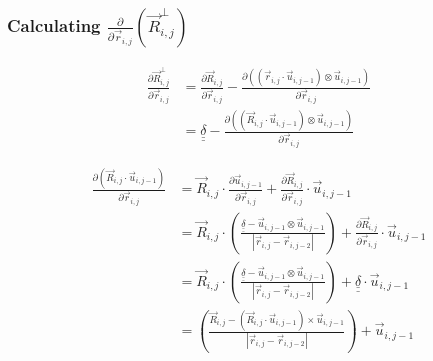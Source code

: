 \documentclass{article}
\renewcommand{\ij}{_{i,j}}
\newcommand{\ijj}{_{i,j-1}}
\newcommand{\ijjj}{_{i,j-2}}
\newcommand{\magn}[1]{\left\vert #1 \right\vert }
\renewcommand{\part}[2]{\frac{\partial #1 }{\partial #2}}
\newcommand{\partbig}[2]{\frac{\partial }{\partial #2}\left( #1 \right)}
\newcommand{\ten}[1]{\underline{\underline{#1}}}
\newcommand{\rij}{\vec{r} \ij}
\newcommand{\Rij}{\vec{R} \ij}
\newcommand{\rijjj}{\vec{r} \ijjj}
\newcommand{\uijj}{\vec{u} \ijj}
\begin{document}
 \subsubsection{Calculating $\displaystyle\partbig{\Rij^\perp}{\rij}$}

\begin{align*}
  \label{eqn:Rperpri}
  \part{\vec{R}\ij ^ \bot}{\vec{r}\ij}  
  &=
  \part{\Rij}{\rij}
  - \part{\left(\left(\vec{r}\ij \cdot \vec{u} \ijj \right) \otimes 
  \vec{u} \ijj \right)
  }{\vec{r}\ij}
  \\
  &=
  \ten{\delta} 
  - \part{\left(\left(\vec{R}\ij \cdot \vec{u} \ijj \right) \otimes 
  \vec{u} \ijj \right)
  }{\vec{r}\ij}
\end{align*}

\begin{align*}
  \part{\left(\vec{R}\ij \cdot \vec{u} \ijj \right)}{\vec{r}\ij}   
  &= 
  \vec{R}\ij \cdot \part{\vec{u} \ijj}{\vec{r} \ij} + \part{\vec{R} \ij}{\vec{r} \ij} \cdot \vec{u}\ijj
  \\
  &= 
  \vec{R}\ij \cdot 
  \left(
  {
  \frac{\ten{\delta} - \uijj \otimes \uijj}{\magn{\rij - \rijjj}}
  }
  \right)
  +
  \part{\vec{R} \ij}{\vec{r} \ij} \cdot \vec{u}\ijj
  \\
  &= 
  \vec{R}\ij \cdot 
  \left(
  {
  \frac{\ten{\delta} - \uijj \otimes \uijj}{\magn{\rij - \rijjj}}
  }
  \right)
  + \ten{\delta} \cdot \vec{u} \ijj 
  \\
  &= 
  \left(
  {
  \frac{\Rij - (\Rij \cdot \uijj ) \times \uijj}{\magn{\rij - \rijjj}}
  }
  \right)
  + 
  \vec{u} \ijj 
\end{align*}
\end{document}
